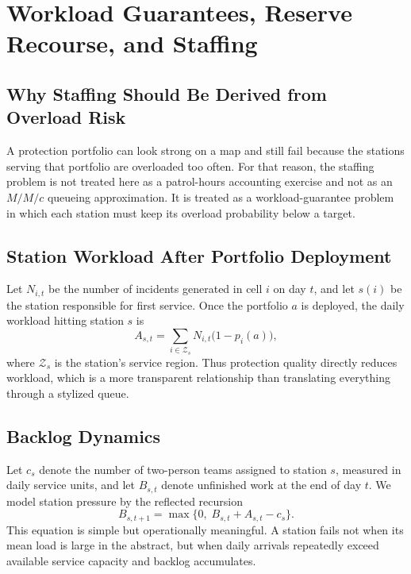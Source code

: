 \section{Workload Guarantees, Reserve Recourse, and Staffing}
\subsection{Why Staffing Should Be Derived from Overload Risk}
A protection portfolio can look strong on a map and still fail because the stations serving that portfolio are overloaded too often. For that reason, the staffing problem is not treated here as a patrol-hours accounting exercise and not as an \(M/M/c\) queueing approximation. It is treated as a workload-guarantee problem in which each station must keep its overload probability below a target.

\subsection{Station Workload After Portfolio Deployment}
Let \(N_{i,t}\) be the number of incidents generated in cell \(i\) on day \(t\), and let \(s(i)\) be the station responsible for first service. Once the portfolio \(a\) is deployed, the daily workload hitting station \(s\) is
\begin{equation}
A_{s,t}
=
\sum_{i\in\mathcal{Z}_s} N_{i,t}\bigl(1-p_i(a)\bigr),
\label{eq:arrival}
\end{equation}
where \(\mathcal{Z}_s\) is the station's service region. Thus protection quality directly reduces workload, which is a more transparent relationship than translating everything through a stylized queue.

\subsection{Backlog Dynamics}
Let \(c_s\) denote the number of two-person teams assigned to station \(s\), measured in daily service units, and let \(B_{s,t}\) denote unfinished work at the end of day \(t\). We model station pressure by the reflected recursion
\begin{equation}
B_{s,t+1}=\max\{0,\;B_{s,t}+A_{s,t}-c_s\}.
\label{eq:erlang}
\end{equation}
This equation is simple but operationally meaningful. A station fails not when its mean load is large in the abstract, but when daily arrivals repeatedly exceed available service capacity and backlog accumulates.

